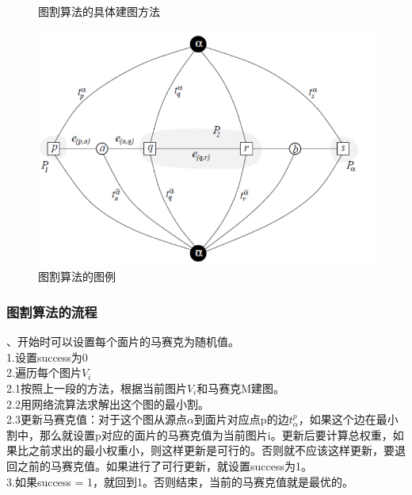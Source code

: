 \documentclass[11pt,a4,notitlepage]{article}
\begin{document}
\begin{CJK}{UTF8}{gkai}
\begin{figure}[h]
	\caption{图割算法的具体建图方法}
\end{figure}
 \begin{figure}[h]
	\centering
	\includegraphics[scale=0.5]{cutshow.png}
	\caption{图割算法的图例}
\end{figure}
\subsubsection*{图割算法的流程}
、开始时可以设置每个面片的马赛克为随机值。\\
1.设置success为0\\
2.遍历每个图片$V_{i}$\\
2.1\qquad  按照上一段的方法，根据当前图片$V_{i}$和马赛克M建图。\\
2.2\qquad   用网络流算法求解出这个图的最小割。\\
2.3\qquad  更新马赛克值：对于这个图从源点$\alpha$到面片对应点p的边$t_{\alpha}^{p}$，如果这个边在最小割中，那么就设置p对应的面片的马赛克值为当前图片i。更新后要计算总权重，如果比之前求出的最小权重小，则这样更新是可行的。否则就不应该这样更新，要退回之前的马赛克值。如果进行了可行更新，就设置success为1。\\
3.如果success = 1，就回到1。否则结束，当前的马赛克值就是最优的。


\end{CJK}
\end{document}
